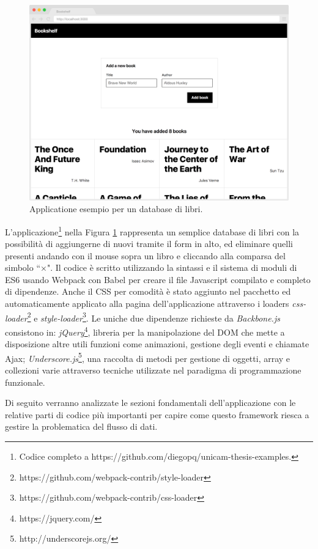\begin{figure}[h]
\centering
\includegraphics[width=14cm]{./images/bookshelfApplication1}
\caption{Applicatione esempio per un database di libri.}
\label{bookshelfApplication1}
\end{figure}

L'applicazione\footnote{Codice completo a https://github.com/diegopq/unicam-thesis-examples.} nella Figura \ref{bookshelfApplication1} rappresenta un semplice database di libri con la possibilità di aggiungerne di nuovi tramite il form in alto, ed eliminare quelli presenti andando con il mouse sopra un libro e cliccando alla comparsa del simbolo “×".
Il codice è scritto utilizzando la sintassi e il sistema di moduli di ES6 usando Webpack con Babel per creare il file Javascript compilato e completo di dipendenze. Anche il CSS per comodità è stato aggiunto nel pacchetto ed automaticamente applicato alla pagina dell'applicazione attraverso i loaders \textit{css-loader}\footnote{https://github.com/webpack-contrib/style-loader} e \textit{style-loader}\footnote{https://github.com/webpack-contrib/css-loader}.
Le uniche due dipendenze richieste da \textit{Backbone.js} consistono in: \textit{jQuery}\footnote{https://jquery.com/}, libreria per la manipolazione del DOM che mette a disposizione altre utili funzioni come animazioni, gestione degli eventi e chiamate Ajax; \textit{Underscore.js}\footnote{http://underscorejs.org/}, una raccolta di metodi per gestione di oggetti, array e collezioni varie attraverso tecniche utilizzate nel paradigma di programmazione funzionale.

Di seguito verranno analizzate le sezioni fondamentali dell'applicazione con le relative parti di codice più importanti per capire come questo framework riesca a gestire la problematica del flusso di dati.

